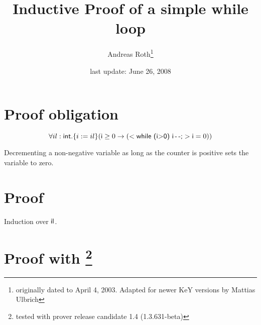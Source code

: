 \documentclass[11pt]{article}
\newcommand{\java}[1]{\mbox{\textsf{#1}}}
\begin{document}
\title{Inductive Proof of a simple while loop}
\author{Andreas Roth\footnote{originally dated to April 4, 2003. Adapted for newer KeY versions by Mattias Ulbrich}}
\date{last update: June 26, 2008}

\maketitle

\section*{Proof obligation}
\[ \forall il:\java{int}. \{i:=il\}(\java{i}\geq 0 \rightarrow ( <\java{while (i$>$0) i\,-\,-;}> \java{i}=0))\]

\noindent Decrementing a non-negative variable as long as the counter is
positive sets the variable to zero.

\section*{Proof}

Induction over $\java{il}$.

\section*{Proof with \KeY\footnote{tested with prover release candidate 1.4 (1.3.631-beta)}}
\end{document}
